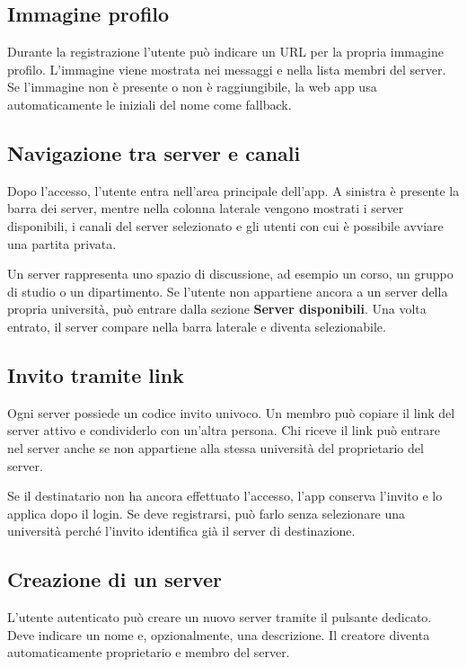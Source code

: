 \documentclass[11pt,a4paper]{article}
\begin{document}
\subsection{Immagine profilo}

Durante la registrazione l'utente può indicare un URL per la propria immagine profilo. L'immagine viene mostrata nei messaggi e nella lista membri del server. Se l'immagine non è presente o non è raggiungibile, la web app usa automaticamente le iniziali del nome come fallback.

\subsection{Navigazione tra server e canali}

Dopo l'accesso, l'utente entra nell'area principale dell'app. A sinistra è presente la barra dei server, mentre nella colonna laterale vengono mostrati i server disponibili, i canali del server selezionato e gli utenti con cui è possibile avviare una partita privata.

Un server rappresenta uno spazio di discussione, ad esempio un corso, un gruppo di studio o un dipartimento. Se l'utente non appartiene ancora a un server della propria università, può entrare dalla sezione \textbf{Server disponibili}. Una volta entrato, il server compare nella barra laterale e diventa selezionabile.

\subsection{Invito tramite link}

Ogni server possiede un codice invito univoco. Un membro può copiare il link del server attivo e condividerlo con un'altra persona. Chi riceve il link può entrare nel server anche se non appartiene alla stessa università del proprietario del server.

Se il destinatario non ha ancora effettuato l'accesso, l'app conserva l'invito e lo applica dopo il login. Se deve registrarsi, può farlo senza selezionare una università perché l'invito identifica già il server di destinazione.

\subsection{Creazione di un server}

L'utente autenticato può creare un nuovo server tramite il pulsante dedicato. Deve indicare un nome e, opzionalmente, una descrizione. Il creatore diventa automaticamente proprietario e membro del server.
\end{document}
